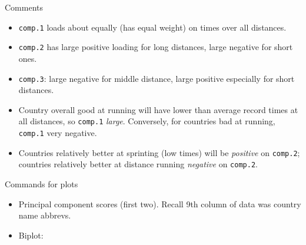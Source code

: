\begin{frame}[fragile]{Comments}
  
  \begin{itemize}
  \item \texttt{comp.1} loads about equally (has equal weight) on
    times over all distances.
  \item \texttt{comp.2} has large positive loading for long
    distances, large negative for short ones.
  \item \texttt{comp.3}: large negative for middle distance, large
    positive especially for short distances.
  \item Country overall good at running will have lower than average record
    times at all distances, so \texttt{comp.1}
    \emph{large}. Conversely, for countries bad at running,
    \texttt{comp.1} very negative.
  \item Countries relatively better at sprinting (low times) will be
    \emph{positive} on \texttt{comp.2}; countries relatively better at
    distance running \emph{negative} on \texttt{comp.2}.
  \end{itemize}
  
\end{frame}

\begin{frame}[fragile]{Commands for plots}
  
  \begin{itemize}
  \item Principal component scores (first two). Recall 9th column of
    data was country name abbrevs.
    
\begin{knitrout}
\color{fgcolor}\begin{kframe}
\begin{alltt}
\hlopt{$}\hlstd{scores[,}\hlopt{:}\hlstd{],}\hlstd{=}\hlstd{)}
\hlopt{$}\hlstd{scores[,}\hlopt{:}\hlstd{],}\hlstd{(track[,}\hlstd{]))}
\end{alltt}
\end{kframe}
\end{knitrout}

\item Biplot:
  
\begin{knitrout}
\color{fgcolor}\begin{kframe}
\begin{alltt}
\hlstd{=track[,}\hlstd{])}
\end{alltt}
\end{kframe}
\end{knitrout}
    
    
  \end{itemize}
  
\end{frame}

